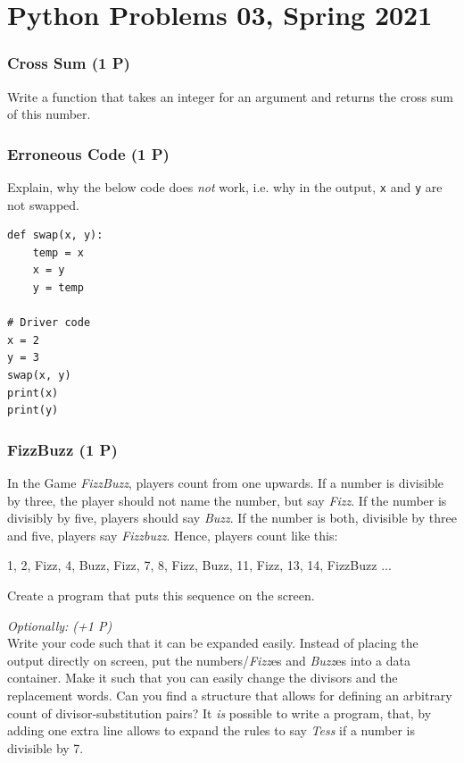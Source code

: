 \documentclass[
	english,
	fontsize=10pt,
	parskip=half,
	titlepage=true,
	DIV=12
]{scrartcl}
\newcommand*{\ie}{i.\;e. }
\begin{document}
\part*{Python Problems 03, Spring 2021}
\section{Cross Sum (1 P)}
Write a function that takes an integer for an argument and returns the cross sum of this number.

\section{Erroneous Code (1 P)}
Explain, why the below code does \emph{not} work, \ie why in the output, \texttt{x} and \texttt{y} are not swapped.
\begin{verbatim}
def swap(x, y): 
    temp = x
    x = y
    y = temp
  
# Driver code 
x = 2
y = 3
swap(x, y) 
print(x) 
print(y) 
\end{verbatim}


\section{FizzBuzz (1 P)}
In the Game \emph{FizzBuzz}, players count from one upwards. If a number is divisible by three, the player should not name the number, but say \emph{Fizz}. If the number is divisibly by five, players should say \emph{Buzz}. If the number is both, divisible by three and five, players say \emph{Fizzbuzz}. Hence, players count like this:
\begin{center}
	1, 2, Fizz, 4, Buzz, Fizz, 7, 8, Fizz, Buzz, 11, Fizz, 13, 14, FizzBuzz ...
\end{center}

Create a program that puts this sequence on the screen.

\emph{Optionally: (+1 P)}\\
Write your code such that it can be expanded easily. Instead of placing the output directly on screen, put the numbers/\emph{Fizz}es and \emph{Buzz}es into a data container. Make it such that you can easily change the divisors and the replacement words. Can you find a structure that allows for defining an arbitrary count of divisor-substitution pairs? It \emph{is} possible to write a program, that, by adding one extra line allows to expand the rules to say \emph{Tess} if a number is divisible by 7.
\end{document}
